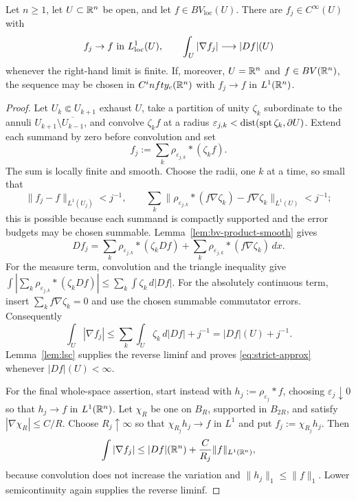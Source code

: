 \begin{theorem}\label{lem:strict-approx}
Let $n\ge1$, let $U\subset\mathbb R^n$ be open, and let
$f\in BV_{\mathrm{loc}}(U)$.  There are $f_j\in C^\infty(U)$ with
\begin{equation}\label{eq:strict-approx}
  f_j\to f\ \text{in}\ L^1_{\mathrm{loc}}(U),
  \qquad
  \int_U|\nabla f_j|\longrightarrow|Df|(U)
\end{equation}
whenever the right-hand limit is finite.
If, moreover, $U=\mathbb R^n$ and $f\in BV(\mathbb R^n)$, the sequence may be chosen in
$C^infty_c(\mathbb R^n)$ with $f_j\to f$ in $L^1(\mathbb R^n)$.
\end{theorem}

\begin{proof}
Let $U_k\Subset U_{k+1}$ exhaust $U$, take a partition of unity $\zeta_k$
subordinate to the annuli $U_{k+1}\setminus\overline{U_{k-1}}$, and convolve
$\zeta_kf$ at a radius
$\varepsilon_{j,k}<\operatorname{dist}(\operatorname{spt}\zeta_k,\partial U)$.  Extend each summand by
zero before convolution and set
\[
  f_j:=\sum_k\rho_{\varepsilon_{j,k}}*(\zeta_kf).
\]
The sum is locally finite and smooth.  Choose the radii, one $k$ at a time,
so small that
\[
 \|f_j-f\|_{L^1(U_j)}<j^{-1},\qquad
 \sum_k\bigl\|\rho_{\varepsilon_{j,k}}*(f\nabla\zeta_k)
                    -f\nabla\zeta_k\bigr\|_{L^1(U)}<j^{-1};
\]
this is possible because each summand is compactly supported and the error
budgets may be chosen summable.  Lemma~\ref{lem:bv-product-smooth} gives
\[
 Df_j=\sum_k\rho_{\varepsilon_{j,k}}*(\zeta_kDf)
       +\sum_k\rho_{\varepsilon_{j,k}}*(f\nabla\zeta_k)\,dx .
\]
For the measure term, convolution and the triangle inequality give
$\int|\sum_k\rho_{\varepsilon_{j,k}}*(\zeta_kDf)|
 \le\sum_k\int\zeta_k\,d|Df|$.  For the absolutely continuous term, insert
$\sum_kf\nabla\zeta_k=0$ and use the chosen summable commutator errors.
Consequently
\[
  \int_U|\nabla f_j|
  \le\sum_k\int_U\zeta_k\,d|Df|+j^{-1}
  =|Df|(U)+j^{-1}.
\]
Lemma~\ref{lem:lsc} supplies the reverse liminf and proves
\eqref{eq:strict-approx} whenever $|Df|(U)<\infty$.

For the final whole-space assertion, start instead with
$h_j:=\rho_{\varepsilon_j}*f$, choosing $\varepsilon_j\downarrow0$ so that
$h_j\to f$ in $L^1(\mathbb R^n)$.  Let $\chi_R$ be one on $B_R$, supported in
$B_{2R}$, and satisfy $|\nabla\chi_R|\le C/R$.  Choose $R_j\uparrow\infty$
so that $\chi_{R_j}h_j\to f$ in $L^1$ and put
$f_j:=\chi_{R_j}h_j$.  Then
\[
 \int|\nabla f_j|
 \le |Df|(\mathbb R^n)+\frac C{R_j}\|f\|_{L^1(\mathbb R^n)},
\]
because convolution does not increase the variation and
$\|h_j\|_1\le\|f\|_1$.  Lower semicontinuity again supplies the reverse
liminf.
\end{proof}
